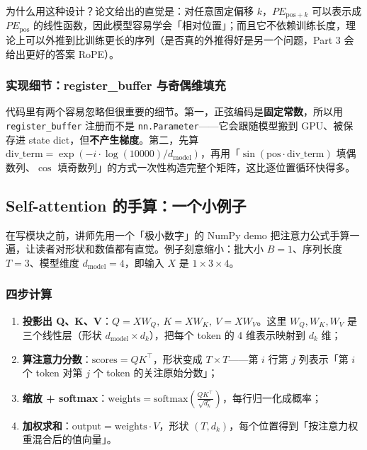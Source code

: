 为什么用这种设计？论文给出的直觉是：对任意固定偏移 $k$，$PE_{\text{pos}+k}$ 可以表示成 $PE_{\text{pos}}$ 的线性函数，因此模型容易学会「相对位置」；而且它不依赖训练长度，理论上可以外推到比训练更长的序列（是否真的外推得好是另一个问题，Part 3 会给出更好的答案 RoPE）。

\subsubsection{实现细节：register\_buffer 与奇偶维填充}

代码里有两个容易忽略但很重要的细节。第一，正弦编码是\textbf{固定常数}，所以用 \texttt{register\_buffer} 注册而不是 \texttt{nn.Parameter}——它会跟随模型搬到 GPU、被保存进 state dict，但\textbf{不产生梯度}。第二，先算 $\text{div\_term}=\exp(-i\cdot\log(10000)/d_{\text{model}})$，再用「$\sin(\text{pos}\cdot\text{div\_term})$ 填偶数列、$\cos$ 填奇数列」的方式一次性构造完整个矩阵，这比逐位置循环快得多。

\subsection{Self-attention 的手算：一个小例子}

在写模块之前，讲师先用一个「极小数字」的 NumPy demo 把注意力公式手算一遍，让读者对形状和数值都有直觉。例子刻意缩小：批大小 $B=1$、序列长度 $T=3$、模型维度 $d_{\text{model}}=4$，即输入 $X$ 是 $1\times3\times4$。

\subsubsection{四步计算}

\begin{enumerate}
\item \textbf{投影出 Q、K、V}：$Q=XW_Q,\ K=XW_K,\ V=XW_V$。这里 $W_Q,W_K,W_V$ 是三个线性层（形状 $d_{\text{model}}\times d_k$），把每个 token 的 4 维表示映射到 $d_k$ 维；
\item \textbf{算注意力分数}：$\text{scores}=QK^{\top}$，形状变成 $T\times T$——第 $i$ 行第 $j$ 列表示「第 $i$ 个 token 对第 $j$ 个 token 的关注原始分数」；
\item \textbf{缩放 + softmax}：$\text{weights}=\mathrm{softmax}\left(\frac{QK^{\top}}{\sqrt{d_k}}\right)$，每行归一化成概率；
\item \textbf{加权求和}：$\text{output}=\text{weights}\cdot V$，形状 $(T,d_k)$，每个位置得到「按注意力权重混合后的值向量」。
\end{enumerate}

